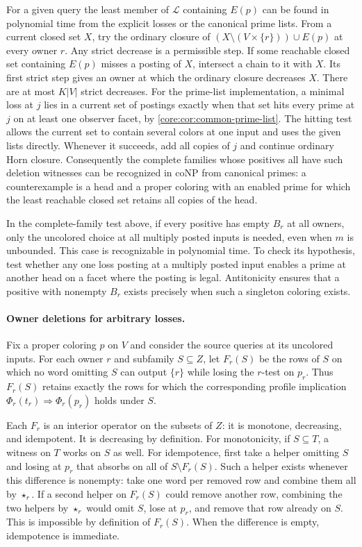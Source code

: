 For a given query the least member of $\mathcal L$ containing $E(p)$
can be found in polynomial time from the explicit losses or the
canonical prime lists. From a current closed set $X$, try the ordinary
closure of $(X\setminus(V\times\{r\}))\cup E(p)$ at every owner $r$.
Any strict decrease is a permissible step. If some reachable closed
set containing $E(p)$ misses a posting of $X$, intersect a chain to
it with $X$. Its first strict step gives an owner at which the
ordinary closure decreases $X$. There are at most $K|V|$ strict
decreases. For the prime-list implementation, a minimal loss at
$j$ lies in a current set of postings exactly when that set hits
every prime at $j$ on at least one observer facet, by
\cref{core:cor:common-prime-list}. The hitting test allows the
current set to contain several colors at one input and uses the
given lists directly. Whenever it succeeds, add all copies of $j$
and continue ordinary Horn closure.
Consequently the complete families whose positives all have such
deletion witnesses can be recognized in coNP from canonical primes:
a counterexample is a head and a proper coloring with an enabled
prime for which the least reachable closed set retains all copies
of the head.

In the complete-family test above, if every positive has empty
$B_r$ at all owners, only the uncolored choice at all multiply
posted inputs is needed, even when $m$ is unbounded. This case is
recognizable in polynomial time. To check its hypothesis, test
whether any one loss posting at a multiply posted input enables a
prime at another head on a facet where the posting is legal.
Antitonicity ensures that a positive with nonempty $B_r$ exists
precisely when such a singleton coloring exists.

\paragraph{Owner deletions for arbitrary losses.}
Fix a proper coloring $p$ on $V$ and consider the source queries at
its uncolored inputs. For each owner $r$ and subfamily $S\subseteq Z$,
let $F_r(S)$ be the rows of $S$ on which no word omitting $S$ can
output $\{r\}$ while losing the $r$-test on $p_r$. Thus $F_r(S)$
retains exactly the rows for which the corresponding profile
implication $\Phi_r(t_r)\Rightarrow\Phi_r(p_r)$ holds under $S$.

Each $F_r$ is an interior operator on the subsets of $Z$: it is
monotone, decreasing, and idempotent. It is decreasing by
definition. For monotonicity, if $S\subseteq T$, a witness on $T$
works on $S$ as well. For idempotence, first take a helper
omitting $S$ and losing at $p_r$ that absorbs on all of
$S\setminus F_r(S)$. Such a helper exists whenever this difference
is nonempty: take one word per removed row and combine them all
by $\star_r$. If a second helper on $F_r(S)$ could remove another
row, combining the two helpers by $\star_r$ would omit $S$,
lose at $p_r$, and remove that row already on $S$. This is
impossible by definition of $F_r(S)$. When the difference is
empty, idempotence is immediate.

